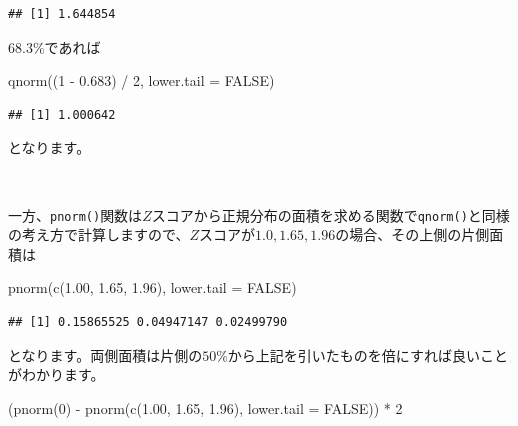 \documentclass[]{tufte-handout}
\newenvironment{Shaded}{}{}
\newcommand{\AttributeTok}[1]{\textcolor[rgb]{0.49,0.56,0.16}{#1}}
\newcommand{\ConstantTok}[1]{\textcolor[rgb]{0.53,0.00,0.00}{#1}}
\newcommand{\DecValTok}[1]{\textcolor[rgb]{0.25,0.63,0.44}{#1}}
\newcommand{\FloatTok}[1]{\textcolor[rgb]{0.25,0.63,0.44}{#1}}
\newcommand{\FunctionTok}[1]{\textcolor[rgb]{0.02,0.16,0.49}{#1}}
\newcommand{\NormalTok}[1]{#1}
\newcommand{\SpecialCharTok}[1]{\textcolor[rgb]{0.25,0.44,0.63}{#1}}
\begin{document}
\begin{verbatim}
## [1] 1.644854
\end{verbatim}

\(68.3\%\)であれば

\begin{Shaded}
\begin{Highlighting}[numbers=left,,]
\FunctionTok{qnorm}\NormalTok{((}\DecValTok{1} \SpecialCharTok{{-}} \FloatTok{0.683}\NormalTok{) }\SpecialCharTok{/} \DecValTok{2}\NormalTok{, }\AttributeTok{lower.tail =} \ConstantTok{FALSE}\NormalTok{)}
\end{Highlighting}
\end{Shaded}

\begin{verbatim}
## [1] 1.000642
\end{verbatim}

となります。

　

一方、\texttt{pnorm()}関数は\(Z\)スコアから正規分布の面積を求める関数で\texttt{qnorm()}と同様の考え方で計算しますので、\(Z\)スコアが\(1.0, 1.65, 1.96\)の場合、その上側の片側面積は

\begin{Shaded}
\begin{Highlighting}[numbers=left,,]
\FunctionTok{pnorm}\NormalTok{(}\FunctionTok{c}\NormalTok{(}\FloatTok{1.00}\NormalTok{, }\FloatTok{1.65}\NormalTok{, }\FloatTok{1.96}\NormalTok{), }\AttributeTok{lower.tail =} \ConstantTok{FALSE}\NormalTok{)}
\end{Highlighting}
\end{Shaded}

\begin{verbatim}
## [1] 0.15865525 0.04947147 0.02499790
\end{verbatim}

となります。両側面積は片側の\(50\%\)から上記を引いたものを倍にすれば良いことがわかります。

\begin{Shaded}
\begin{Highlighting}[numbers=left,,]
\NormalTok{(}\FunctionTok{pnorm}\NormalTok{(}\DecValTok{0}\NormalTok{) }\SpecialCharTok{{-}} \FunctionTok{pnorm}\NormalTok{(}\FunctionTok{c}\NormalTok{(}\FloatTok{1.00}\NormalTok{, }\FloatTok{1.65}\NormalTok{, }\FloatTok{1.96}\NormalTok{), }\AttributeTok{lower.tail =} \ConstantTok{FALSE}\NormalTok{)) }\SpecialCharTok{*} \DecValTok{2}
\end{Highlighting}
\end{Shaded}
\end{document}
